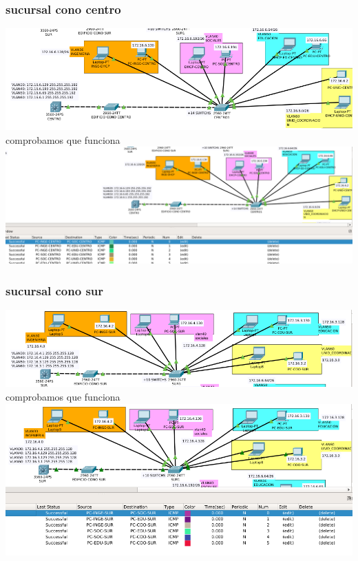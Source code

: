 \subsubsection{sucursal cono centro}
\includegraphics[scale=0.45]{img/VLANCENTRO.png} 
\\comprobamos que funciona\\
\includegraphics[scale=0.35]{img/centrosucess.png} 
\subsubsection{sucursal cono sur}
\includegraphics[scale=0.45]{img/VLANSUR.png} 
\\comprobamos que funciona\\
\includegraphics[scale=0.45]{img/sursucess.png} 

